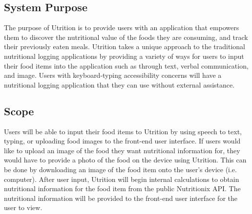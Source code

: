 \documentclass[12pt, titlepage]{article}
\begin{document}
\subsection{System Purpose}

The purpose of Utrition is to provide users with an application that empowers 
them to discover the nutritional value of the foods they are consuming, and track
their previously eaten meals. Utrition takes a unique approach to the traditional nutritional logging applications by providing a variety of ways for users to input their food items into the application such as through text, verbal communication, and image. Users with keyboard-typing accessibility concerns will have a nutritional logging application that they can use without external assistance.

\subsection{Scope}

Users will be able to input their food items to Utrition by using speech to text, typing, or uploading food images to the front-end user interface. If users would like to upload an image of the food they want nutritional information for, they would have to provide a photo of the food on the device using Utrition. This can be done by downloading an image of the food item onto the user's device (i.e. computer). After user input, Utrition will begin internal calculations to obtain nutritional information for the food item from the public Nutritionix API. The nutritional information will be provided to the front-end user interface for the user to view.

\end{document}
